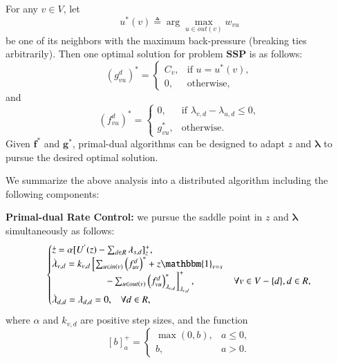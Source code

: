 \documentclass[10pt,conference]{IEEEtran}
\begin{document}
For any $v\in V$, let
\begin{equation}\label{eq:opt.neighbor}
u^{*}(v)\triangleq\arg\max_{u\in out(v)}w_{vu}
\end{equation}
be one of its neighbors with the maximum back-pressure (breaking ties
arbitrarily). Then one optimal solution for problem $\mathbf{SSP}$
is as follows:\begin{equation}
\left(g_{vu}^{d}\right)^{*}=\begin{cases}
C_{v}, & \mbox{if }u=u^{*}(v),\\
0, & \mbox{otherwise,}\end{cases}
\label{eq:g_vu}\end{equation}
 and \begin{equation}
\left(f_{vu}^{d}\right)^{*}=\begin{cases}
0, & \mbox{if }\lambda_{v,d}-\lambda_{u,d}\leq0,\\
g_{vu}^{*}, & \mbox{otherwise.}\end{cases}
\label{eq:f_vu}
\end{equation}
 Given $\boldsymbol{f}^{*}$ and $\boldsymbol{g}^{*}$, primal-dual
algorithms can be designed to adapt $z$ and $\boldsymbol{\lambda}$
to pursue the desired optimal solution.

We summarize the above analysis into a distributed algorithm including
the following components:

\textbf{Primal-dual Rate Control: }we pursue the saddle point in $z$
and $\boldsymbol{\lambda}$ simultaneously as follows: \begin{equation}
\begin{cases}
\dot{z}=\alpha[U^{'}(z)-\sum_{d\in R}\lambda_{s,d}]_{z}^{+},\\
\dot{\lambda}_{v,d}=k_{v,d}\left[\sum_{u\in in(v)}\left(f_{uv}^{d}\right)^{*}+z\mathbbm{1}_{v=s}\right.\\
\;\;\;\;\;\;\;\;\;\;\;\;\;\;\;\;\;\;\;\;\left.-\sum_{u\in out(v)}\left(f_{vu}^{d}\right)_{\lambda_{v,d}}^{*}\right]_{\lambda_{v,d}}^{+}, & \forall v\in V-\{d\},d\in R,\\
\dot{\lambda}_{d,d}=\lambda_{d,d}=0,\;\;\;\forall d\in R,\end{cases}\label{eq:PD}\end{equation}
 where $\alpha$ and $k_{v,d}$ are positive step sizes, and the function
\[
[b]_{a}^{+}=\begin{cases}
\max(0,b), & a\le0,\\
b, & a>0.\end{cases}\]
\end{document}
